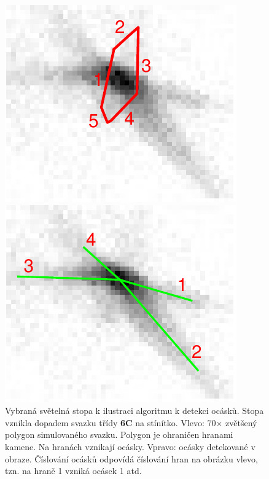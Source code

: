 	\begin{figure}[h!]
	\centering
	\begin{minipage}[c]{0.35\textwidth}
	\includegraphics[width=\textwidth]{figures/tail007.pdf}
	\end{minipage}
	\begin{minipage}[c]{0.35\textwidth}
	\includegraphics[width=\textwidth]{figures/tail008.pdf}
	\end{minipage}
	
	\caption[Detektor ocásků - stopa v obraze.]{Vybraná světelná stopa k ilustraci algoritmu k detekci ocásků. Stopa vznikla dopadem svazku třídy \textbf{6C} na stínítko. Vlevo: 70$\times$ zvětšený polygon simulovaného svazku. Polygon je ohraničen hranami kamene. Na hranách vznikají ocásky. Vpravo: ocásky detekované v obraze. Číslování ocásků odpovídá číslování hran na obrázku vlevo, tzn. na hraně 1 vzniká ocásek 1 atd.}
	\label{fig:mark_tail}
	\end{figure}
	



